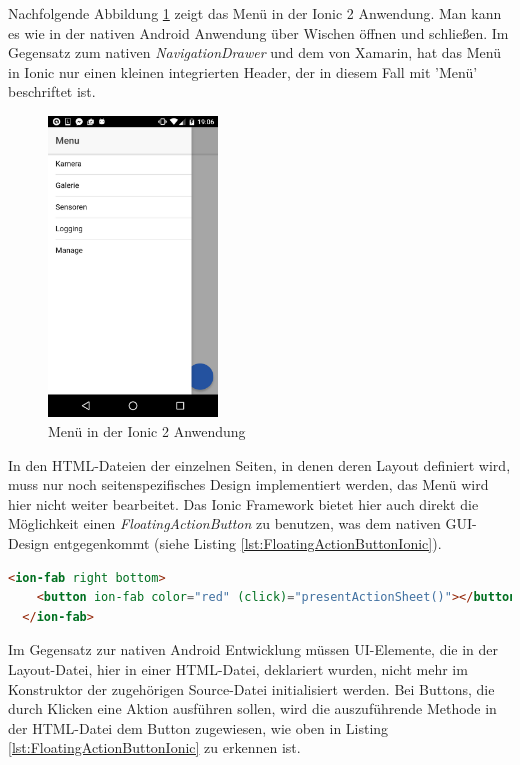 Nachfolgende Abbildung \ref{fig:MenuIonic} zeigt das Menü in der Ionic 2 Anwendung. Man kann es wie in der nativen Android Anwendung über Wischen öffnen und schließen. Im Gegensatz zum nativen \textit{NavigationDrawer} und dem von Xamarin, hat das Menü in Ionic nur einen kleinen integrierten Header, der in diesem Fall mit 'Menü' beschriftet ist. 

\begin{figure}[h]
	\centering
	\includegraphics[width=0.4\textwidth]{Bilder/Screenshot_20170504-190636.PNG}
	\caption{Menü in der Ionic 2 Anwendung}
	\label{fig:MenuIonic}
\end{figure} 

In den HTML-Dateien der einzelnen Seiten, in denen deren Layout definiert wird, muss nur noch seitenspezifisches Design implementiert werden, das Menü wird hier nicht weiter bearbeitet. Das Ionic Framework bietet hier auch direkt die Möglichkeit einen \textit{FloatingActionButton} zu benutzen, was dem nativen GUI-Design entgegenkommt (siehe Listing \ref{lst:FloatingActionButtonIonic}).

\begin{lstlisting}[caption=Deklaration eines \textit{FloatingActionButton}, label=lst:FloatingActionButtonIonic, language=html]
<ion-fab right bottom>
    <button ion-fab color="red" (click)="presentActionSheet()"></button>
  </ion-fab>
\end{lstlisting}

Im Gegensatz zur nativen Android Entwicklung müssen UI-Elemente, die in der Layout-Datei, hier in einer HTML-Datei, deklariert wurden, nicht mehr im Konstruktor der zugehörigen Source-Datei initialisiert werden. Bei Buttons, die durch Klicken eine Aktion ausführen sollen, wird die auszuführende Methode in der HTML-Datei dem Button zugewiesen, wie oben in Listing \ref{lst:FloatingActionButtonIonic} zu erkennen ist. 

